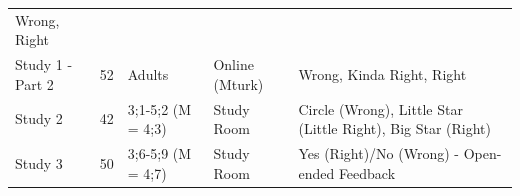 \documentclass[man]{apa6}
\theoremstyle{definition}
\theoremstyle{definition}
\theoremstyle{definition}
\theoremstyle{remark}
\begin{document}
\begin{longtable}[]{@{}lllll@{}}
\begin{minipage}[t]{0.32\columnwidth}
Wrong, Right\strut
\end{minipage}\tabularnewline
\begin{minipage}[t]{0.19\columnwidth}\raggedright\strut
Study 1 - Part 2\strut
\end{minipage} & \begin{minipage}[t]{0.02\columnwidth}\raggedright\strut
52\strut
\end{minipage} & \begin{minipage}[t]{0.20\columnwidth}\raggedright\strut
Adults\strut
\end{minipage} & \begin{minipage}[t]{0.11\columnwidth}\raggedright\strut
Online (Mturk)\strut
\end{minipage} & \begin{minipage}[t]{0.32\columnwidth}\raggedright\strut
Wrong, Kinda Right, Right\strut
\end{minipage}\tabularnewline
\begin{minipage}[t]{0.19\columnwidth}\raggedright\strut
Study 2\strut
\end{minipage} & \begin{minipage}[t]{0.02\columnwidth}\raggedright\strut
42\strut
\end{minipage} & \begin{minipage}[t]{0.20\columnwidth}\raggedright\strut
3;1-5;2 (M = 4;3)\strut
\end{minipage} & \begin{minipage}[t]{0.11\columnwidth}\raggedright\strut
Study Room\strut
\end{minipage} & \begin{minipage}[t]{0.32\columnwidth}\raggedright\strut
Circle (Wrong), Little Star (Little Right), Big Star (Right)\strut
\end{minipage}\tabularnewline
\begin{minipage}[t]{0.19\columnwidth}\raggedright\strut
Study 3\strut
\end{minipage} & \begin{minipage}[t]{0.02\columnwidth}\raggedright\strut
50\strut
\end{minipage} & \begin{minipage}[t]{0.20\columnwidth}\raggedright\strut
3;6-5;9 (M = 4;7)\strut
\end{minipage} & \begin{minipage}[t]{0.11\columnwidth}\raggedright\strut
Study Room\strut
\end{minipage} & \begin{minipage}[t]{0.32\columnwidth}\raggedright\strut
Yes (Right)/No (Wrong) - Open-ended Feedback\strut
\end{minipage}\tabularnewline
\bottomrule
\end{longtable}
\end{document}

